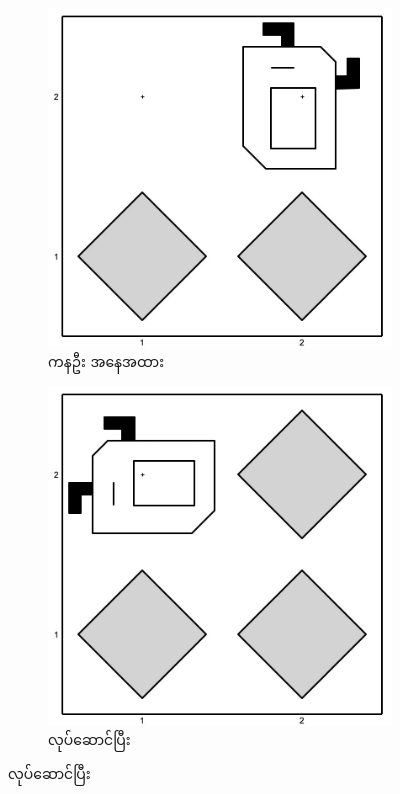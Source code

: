 \begin{sloppypar}
\begin{figure}[tbh!]
    \begin{subfigure}[t]{0.46\textwidth}
        \includegraphics[scale=0.17, left]{ch02/MakeBeeperSquare/2nd_iter.jpg}
        \caption{ကနဦး အနေအထား}
    \end{subfigure}
    \hspace{0.1in}
    \begin{subfigure}[t]{0.46\textwidth}
        \includegraphics[scale=0.17, left]{ch02/MakeBeeperSquare/3rd_iter.jpg}
        \caption{ \mmcommand လုပ်ဆောင်ပြီး}
    \end{subfigure}


\end{figure}
\end{sloppypar}
